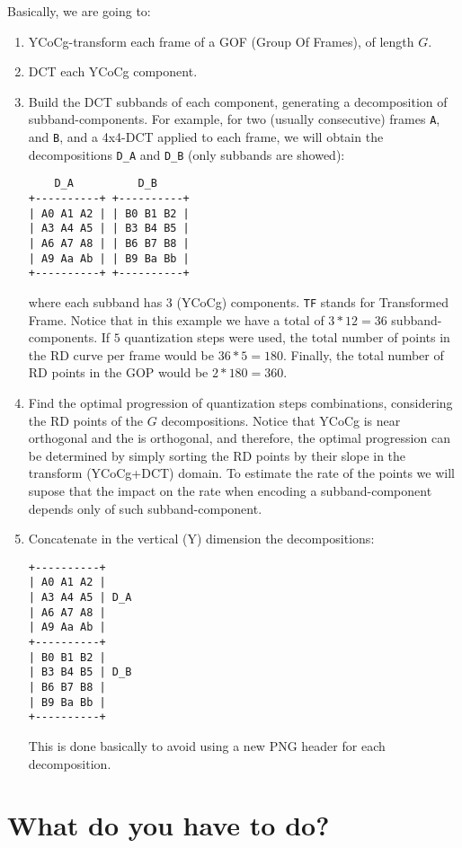 Basically, we are going to:
\begin{enumerate}
\item YCoCg-transform each frame of a GOF (Group Of Frames), of length $G$.
\item DCT each YCoCg component.
\item Build the DCT subbands of each component, generating a
  decomposition of subband-components. For example, for two (usually
  consecutive) frames \verb|A|, and \verb|B|, and a 4x4-DCT applied to
  each frame, we will obtain the decompositions \verb|D_A| and
  \verb|D_B| (only subbands are showed):
\begin{verbatim}
    D_A          D_B
+----------+ +----------+
| A0 A1 A2 | | B0 B1 B2 |
| A3 A4 A5 | | B3 B4 B5 |
| A6 A7 A8 | | B6 B7 B8 |
| A9 Aa Ab | | B9 Ba Bb |
+----------+ +----------+
\end{verbatim}
  where each subband has 3 (YCoCg) components. \verb|TF| stands for
  Transformed Frame. Notice that in this example we have a total of
  $3*12=36$ subband-components. If $5$ quantization steps were used,
  the total number of points in the RD curve per frame would be
  $36*5=180$. Finally, the total number of RD points in the GOP would
  be $2*180=360$.

\item Find the optimal progression of quantization steps combinations,
  considering the RD points of the $G$ decompositions. Notice that
  YCoCg is near orthogonal and the is orthogonal, and therefore, the
  optimal progression can be determined by simply sorting the RD
  points by their slope in the transform (YCoCg+DCT) domain. To
  estimate the rate of the points we will supose that the impact on
  the rate when encoding a subband-component depends only of such
  subband-component.
  
\item Concatenate in the vertical (Y) dimension the decompositions:
\begin{verbatim}
+----------+
| A0 A1 A2 |
| A3 A4 A5 | D_A
| A6 A7 A8 | 
| A9 Aa Ab |
+----------+ 
| B0 B1 B2 |
| B3 B4 B5 | D_B
| B6 B7 B8 |
| B9 Ba Bb |
+----------+
\end{verbatim}
  This is done basically to avoid using a new PNG header for each
  decomposition.
\end{enumerate}


\section{What do you have to do?}

